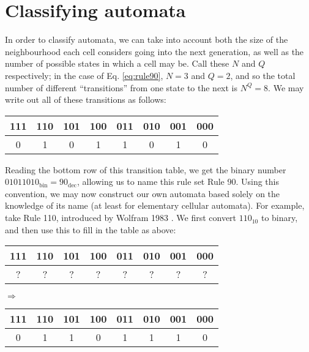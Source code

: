 \documentclass[11pt,a4paper]{article}
\begin{document}
\section{Classifying automata}
    In order to classify automata, we can take into account both the size of the
    neighbourhood each cell considers going into the next generation, as well as
    the number of possible states in which a cell may be. Call these $N$ and $Q$
    respectively; in the case of Eq. \ref{eq:rule90}, $N=3$ and $Q=2$, and so the
    total number of different ``transitions'' from one state to the next is $N^Q
    = 8$. We may write out all of these transitions as follows:

    \begin{table}[h]
        \centering
        \begin{tabular}{c|c|c|c|c|c|c|c}
            111 & 110 & 101 & 100 & 011 & 010 & 001 & 000 \\
            \hline
            0   & 1   & 0   & 1   & 1   & 0   & 1   & 0
        \end{tabular}
    \end{table}

    Reading the bottom row of this transition table, we get the binary number
    $01011010_{\text{bin}} = 90_{\text{dec}}$, allowing us to name this rule set
    Rule 90. Using this convention, we may now construct our own automata based
    solely on the knowledge of its name (at least for elementary cellular
    automata). For example, take Rule 110, introduced by Wolfram 1983
    \cite{WolframRule110}. We first convert $110_{10}$ to binary, and then use
    this to fill in the table as above:

    \begin{table}[h]
        \begin{minipage}{.5\linewidth}
            \centering
            \begin{tabular}{c|c|c|c|c|c|c|c}
                111 & 110 & 101 & 100 & 011 & 010 & 001 & 000 \\
                \hline
                ? & ? & ? & ? & ? & ? & ? & ?
            \end{tabular}
        \end{minipage}%
        $ \Rightarrow $
        \begin{minipage}{.6\linewidth}
            \begin{tabular}{c|c|c|c|c|c|c|c}
                111 & 110 & 101 & 100 & 011 & 010 & 001 & 000 \\
                \hline
                0 & 1 & 1 & 0 & 1 & 1 & 1 & 0
            \end{tabular}
        \end{minipage}
    \end{table}
\end{document}
